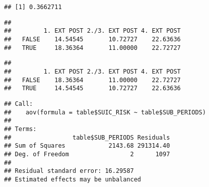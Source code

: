 \documentclass[
]{book}
\newenvironment{Shaded}{\begin{snugshade}}{\end{snugshade}}
\newcommand{\CommentTok}[1]{\textcolor[rgb]{0.56,0.35,0.01}{\textit{#1}}}
\newcommand{\DecValTok}[1]{\textcolor[rgb]{0.00,0.00,0.81}{#1}}
\newcommand{\FunctionTok}[1]{\textcolor[rgb]{0.00,0.00,0.00}{#1}}
\newcommand{\NormalTok}[1]{#1}
\newcommand{\OtherTok}[1]{\textcolor[rgb]{0.56,0.35,0.01}{#1}}
\newcommand{\SpecialCharTok}[1]{\textcolor[rgb]{0.00,0.00,0.00}{#1}}
\begin{document}
\begin{verbatim}
## [1] 0.3662711
\end{verbatim}

\begin{Shaded}
\end{Shaded}

\begin{verbatim}
##        
##         1. EXT POST 2./3. EXT POST 4. EXT POST
##   FALSE    14.54545       10.72727    22.63636
##   TRUE     18.36364       11.00000    22.72727
\end{verbatim}

\begin{Shaded}
\end{Shaded}

\begin{verbatim}
##        
##         1. EXT POST 2./3. EXT POST 4. EXT POST
##   FALSE    18.36364       11.00000    22.72727
##   TRUE     14.54545       10.72727    22.63636
\end{verbatim}

\begin{Shaded}
\end{Shaded}

\begin{verbatim}
## Call:
##    aov(formula = table$SUIC_RISK ~ table$SUB_PERIODS)
## 
## Terms:
##                 table$SUB_PERIODS Residuals
## Sum of Squares            2143.68 291314.40
## Deg. of Freedom                 2      1097
## 
## Residual standard error: 16.29587
## Estimated effects may be unbalanced
\end{verbatim}
\end{document}
